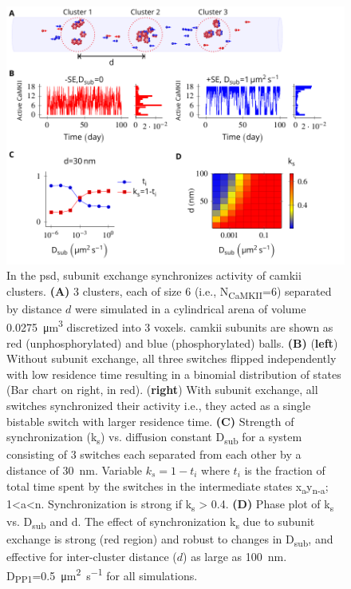 \documentclass[9pt,lineno,doublespacing]{elife}
\newcommand\SUB[2]{#1\textsubscript{#2}}
\begin{document}
\begin{figure}%
    \includegraphics[width=0.95\linewidth]{./PaperFigures/elifeFigure5/figure_sync_150mm.pdf}
    \caption{In the \gls{psd}, subunit exchange synchronizes activity of
        \gls{camkii} clusters. 
        \textbf{(A)} 3 clusters, each of size 6 (i.e.,
        \SUB{N}{CaMKII}=6) separated by distance \(d\) were simulated in a
        cylindrical arena of volume \SI{0.0275}{\micro\meter^3} discretized
        into 3 voxels. \Gls{camkii} subunits are shown as red 
        (unphosphorylated) and blue (phosphorylated) balls. 
        \textbf{(B)} (\textbf{left}) Without subunit exchange, all three
        switches flipped independently with low residence time resulting in a
        binomial distribution of states (Bar chart on right, in red). (\textbf{right})
        With subunit exchange, all switches synchronized their activity i.e.,
        they acted as a single bistable switch with larger residence time.
        \textbf{(C)} Strength of synchronization (\SUB{k}{s})
        vs. diffusion constant \SUB{D}{sub} for a system consisting of 3 switches
        each separated from each other by a distance of \SI{30}{\nano \meter}.
        Variable $k_s=1-t_i$ where $t_i$ is the fraction of total time spent by
        the switches in the intermediate states
        x\textsubscript{a}y\textsubscript{n-a}; 1\textless{}a\textless{}n.
        Synchronization is strong if k\textsubscript{s} \textgreater{} 0.4.
        \textbf{(D)} Phase plot of \SUB{k}{s} vs. \SUB{D}{sub} and d. The effect
        of synchronization \SUB{k}{s} due to subunit exchange is strong (red
        region) and robust to changes in \SUB{D}{sub}, and effective for
        inter-cluster distance ($d$) as large as \SI{100}{\nano\meter}. 
        \SUB{D}{PP1}=\SI{0.5}{\micro\meter\squared\per\second} for all
        simulations.
    }\label{fig:sync_spread}
\end{figure}
\end{document}
